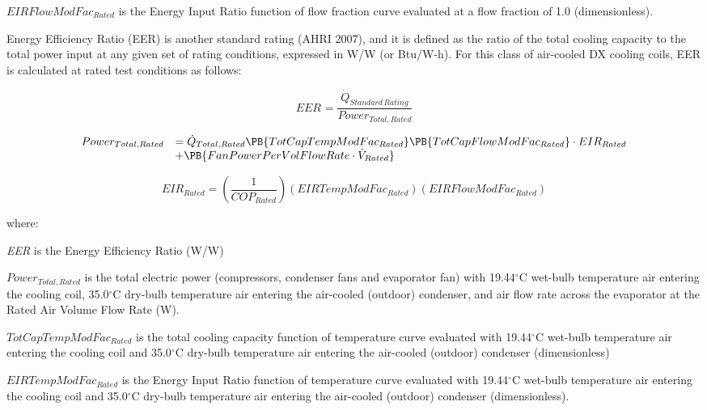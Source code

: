 \(EIRFlowModFa{c_{Rated}}\) is the Energy Input Ratio function of flow fraction curve evaluated at a flow fraction of 1.0 (dimensionless).

Energy Efficiency Ratio (EER) is another standard rating (AHRI 2007), and it is defined as the ratio of the total cooling capacity to the total power input at any given set of rating conditions, expressed in W/W (or Btu/W-h). For this class of air-cooled DX cooling coils, EER is calculated at rated test conditions as follows:

\begin{equation}
EE{R_{}} = \frac{{{{\dot Q}_{Standard\,Rating}}}}{{Powe{r_{Total,Rated}}}}
\end{equation}

\begin{equation}
  \begin{array}{rl}
    Power_{Total,Rated} &= \dot{Q}_{Total,Rated} \PB{TotCapTempModFac_{Rated}}\PB{TotCapFlowModFac_{Rated}}\cdot EIR_{Rated} \\
                        &+ \PB{FanPowerPerVolFlowRate \cdot \dot{V}_{Rated}}
  \end{array}
\end{equation}

\begin{equation}
EI{R_{Rated}} = \left( {\frac{1}{{CO{P_{Rated}}}}} \right)(EIRTempModFa{c_{Rated}})(EIRFlowModFa{c_{Rated}})
\end{equation}

where:

\emph{EER} is the Energy Efficiency Ratio (W/W)

\(Powe{r_{Total,Rated}}\) is the total electric power (compressors, condenser fans and evaporator fan) with 19.44\(^{\circ}\)C wet-bulb temperature air entering the cooling coil, 35.0\(^{\circ}\)C dry-bulb temperature air entering the air-cooled (outdoor) condenser, and air flow rate across the evaporator at the Rated Air Volume Flow Rate (W).

\(TotCapTempModFa{c_{Rated}}\) is the total cooling capacity function of temperature curve evaluated with 19.44\(^{\circ}\)C wet-bulb temperature air entering the cooling coil and 35.0\(^{\circ}\)C dry-bulb temperature air entering the air-cooled (outdoor) condenser (dimensionless)

\(EIRTempModFa{c_{Rated}}\) is the Energy Input Ratio function of temperature curve evaluated with 19.44\(^{\circ}\)C wet-bulb temperature air entering the cooling coil and 35.0\(^{\circ}\)C dry-bulb temperature air entering the air-cooled (outdoor) condenser (dimensionless).

